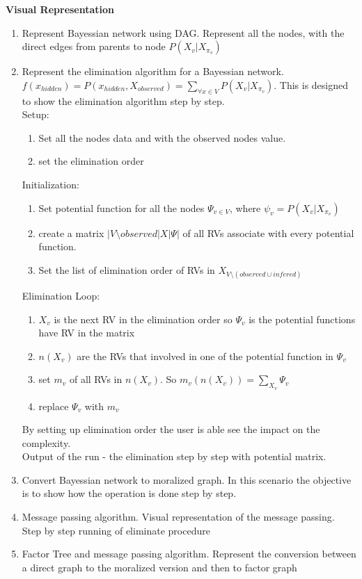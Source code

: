 \documentclass{article}
\begin{document}
    \textbf{Visual Representation}\\
    \begin{enumerate}
        \item Represent Bayessian network using DAG. Represent all the nodes, with the direct edges from parents to node $P(X_v | X_{\pi_v})$
        \item Represent the elimination algorithm for a Bayessian network. $f(x_{hidden})=P(x_{hidden},X_{observed})=\sum_{\forall x \in V}P(X_v|X_{\pi_v})$. This is designed to show the elimination algorithm step by step.\\
        Setup:\\
        \begin{enumerate}
            \item Set all the nodes data and with the observed nodes value.
            \item set the elimination order
        \end{enumerate}
        Initialization:\\
        \begin{enumerate}
            \item Set potential function for all the nodes $\Psi_{v \in V}$, where $\psi_v = P(X_v|X_{\pi_v})$
            \item create a matrix $|V\setminus observed| X |\Psi|$ of all RVs associate with every potential function.
            \item Set the list of elimination order of RVs in $X_{V\setminus (observed \cup infered)}$
        \end{enumerate}
        Elimination Loop:\\
        \begin{enumerate}
            \item $X_v$ is the next RV in the elimination order so $\Psi_v$ is the potential functions have RV in the matrix
            \item $n(X_v)$ are the RVs that involved in one of the potential function in $\Psi_v$
            \item set $m_v$ of all RVs in $n(X_v)$. So $m_v(n(X_v))=\sum_{X_v}\Psi_v$
            \item replace $\Psi_v$ with $m_v$
        \end{enumerate}
        By setting up elimination order the user is able see the impact on the complexity.\\
        Output of the run - the elimination step by step with potential matrix.

        \item Convert Bayessian network to moralized graph. In this scenario the objective is to show how the operation is done step by step.

        \item Message passing algorithm. Visual representation of the message passing. Step by step running of eliminate procedure

        \item Factor Tree and message passing algorithm. Represent the conversion between a direct graph to the moralized version and then to factor graph
    \end{enumerate}
\end{document}

